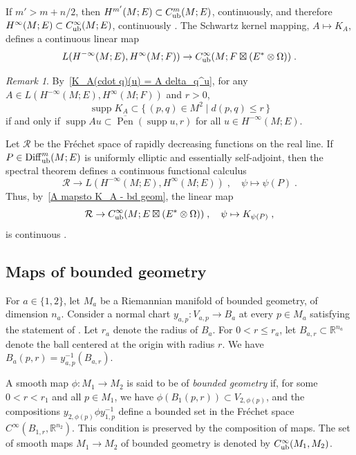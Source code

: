 \documentclass{memo-l}
\theoremstyle{plain}
\theoremstyle{definition}
\theoremstyle{remark}
\newtheorem{rem}[thm]{Remark}
\newcommand{\R}{\mathbb{R}}
\newcommand{\RR}{\mathcal{R}}
\newcommand{\supp}{\operatorname{supp}}
\newcommand{\Diff}{\operatorname{Diff}}
\newcommand{\Pen}{\operatorname{Pen}}
\newcommand{\Diffub}{\Diff_{\text{\rm ub}}}
\newcommand{\Cinftyub}{C^\infty_{\text{\rm ub}}}
\numberwithin{section}{chapter}
\numberwithin{equation}{section}%
\begin{document}
If $m'>m+n/2$, then $H^{m'}(M;E)\subset C_{\text{\rm ub}}^m(M;E)$, continuously, and therefore $H^\infty(M;E)\subset \Cinftyub(M;E)$, continuously \cite[Proposition~2.8]{Roe1988I}. The Schwartz kernel mapping, $A\mapsto K_A$, defines a continuous linear map \cite[Proposition~2.9]{Roe1988I}
\begin{equation}\label{A mapsto K_A - bd geom}
L(H^{-\infty}(M;E),H^\infty(M;F))\to\Cinftyub(M;F\boxtimes(E^*\otimes\Omega))\;.
\end{equation}

\begin{rem}\label{r: supp K_A subset r-penumbra <=> supp Au subset r-penumbra for all u}
By~\eqref{K_A(cdot q)(u) = A delta_q^u}, for any $A\in L(H^{-\infty}(M;E),H^\infty(M;F))$ and $r>0$,
\[
\supp K_A\subset\{\,(p,q)\in M^2\mid d(p,q)\le r\,\}
\]
if and only if $\supp Au\subset\overline{\Pen}(\supp u,r)$ for all $u\in H^{-\infty}(M;E)$.
\end{rem}

Let $\RR$ \index{$\RR$} be the Fr\'echet space of rapidly decreasing functions on the real line. If $P\in\Diffub^m(M;E)$ is uniformly elliptic and essentially self-adjoint, then the spectral theorem defines a continuous functional calculus 
\[
\RR\to L(H^{-\infty}(M;E),H^\infty(M;E))\;,\quad\psi\mapsto\psi(P)\;.
\]
Thus, by~\eqref{A mapsto K_A - bd geom}, the linear map
\begin{equation}\label{psi mapsto K_psi(P)}
\RR\to \Cinftyub(M;E\boxtimes(E^*\otimes\Omega))\;,\quad\psi\mapsto K_{\psi(P)}\;,
\end{equation}
is continuous \cite[Proposition~2.10]{Roe1988I}. 



\subsection{Maps of bounded geometry}\label{ss: maps of bd geom}

For $a\in\{1,2\}$, let $M_a$ be a Riemannian manifold of bounded geometry, of dimension $n_a$. Consider a normal chart $y_{a,p}:V_{a,p}\to B_a$ at every $p\in M_a$ satisfying the statement of . Let $r_a$ denote the radius of $B_a$. For $0<r\le r_a$, let $B_{a,r}\subset\R^{n_a}$ denote the ball centered at the origin with radius $r$. We have $B_a(p,r)=y_{a,p}^{-1}(B_{a,r})$.

A smooth map $\phi:M_1\to M_2$ is said to be of \emph{bounded geometry} if, for some $0<r<r_1$ and all $p\in M_1$, we have $\phi(B_1(p,r))\subset V_{2,\phi(p)}$, and the compositions $y_{2,\phi(p)}\phi y_{1,p}^{-1}$ define a bounded set in the Fr\'echet space $C^\infty(B_{1,r},\R^{n_2})$. This condition is preserved by the composition of maps. The set of smooth maps $M_1\to M_2$ of bounded geometry is denoted by $\Cinftyub(M_1,M_2)$.
\end{document}
